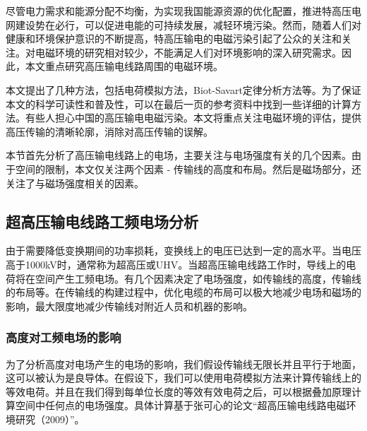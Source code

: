 \documentclass{ctexart} %
\begin{document}
尽管电力需求和能源分配不均衡，为实现我国能源资源的优化配置，推进特高压电网建设势在必行，可以促进电能的可持续发展，减轻环境污染。然而，随着人们对健康和环境保护意识的不断提高，特高压输电的电磁污染引起了公众的关注和关注。对电磁环境的研究相对较少，不能满足人们对环境影响的深入研究需求。因此，本文重点研究高压输电线路周围的电磁环境。

本文提出了几种方法，包括电荷模拟方法，Biot-Savart定律分析方法等。为了保证本文的科学可读性和普及性，可以在最后一页的参考资料中找到一些详细的计算方法。有些人担心中国的高压输电电磁污染。本文将重点关注电磁环境的评估，提供高压传输的清晰轮廓，消除对高压传输的误解。

本节首先分析了高压输电线路上的电场，主要关注与电场强度有关的几个因素。由于空间的限制，本文仅关注两个因素 - 传输线的高度和布局。然后是磁场部分，还关注了与磁场强度相关的因素。

\subsection{ 超高压输电线路工频电场分析}

由于需要降低变换期间的功率损耗，变换线上的电压已达到一定的高水平。当电压高于1000kV时，通常称为超高压或UHV。当超高压输电线路工作时，导线上的电荷将在空间产生工频电场。有几个因素决定了电场强度，如传输线的高度，传输线的布局等。在传输线的构建过程中，优化电缆的布局可以极大地减少电场和磁场的影响，最大限度地减少传输线对附近人员和机器的影响。



\subsubsection{高度对工频电场的影响}

为了分析高度对电场产生的电场的影响，我们假设传输线无限长并且平行于地面，这可以被认为是良导体。在假设下，我们可以使用电荷模拟方法来计算传输线上的等效电荷。并且在我们得到每单位长度的等效有效电荷之后，可以根据叠加原理计算空间中任何点的电场强度。具体计算基于张可心的论文“超高压输电线路电磁环境研究（2009）\cite{张可心2009超高压传输线电磁环境特性研究}”。
\end{document}
